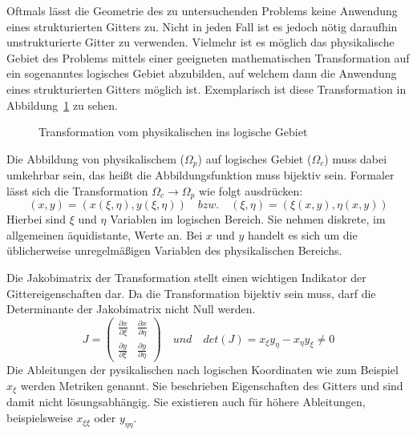 Oftmals lässt die Geometrie des zu untersuchenden Problems keine Anwendung eines
strukturierten Gitters zu. Nicht in jeden Fall ist es jedoch nötig daraufhin unstrukturierte
Gitter zu verwenden. Vielmehr ist es möglich das physikalische Gebiet des Problems
mittels einer geeigneten mathematischen Transformation auf ein sogenanntes
logisches Gebiet abzubilden, auf welchem dann die Anwendung eines strukturierten Gitters
möglich ist. Exemplarisch ist diese Transformation in Abbildung~\ref{fig:transf} zu sehen.
\begin{figure}[ht]

\centering
\caption{Transformation vom physikalischen ins logische Gebiet}
\label{fig:transf}
\end{figure}
Die Abbildung von physikalischem ($\Omega_p$) auf logisches Gebiet ($\Omega_c$) muss dabei umkehrbar sein, das heißt
die Abbildungsfunktion muss bijektiv sein. Formaler lässt sich die Transformation
$\Omega_c \rightarrow \Omega_p$ wie folgt ausdrücken:
\begin{equation}
  (x,y) = (x(\xi, \eta), y(\xi, \eta)) \quad bzw. \quad (\xi,\eta) = (\xi(x, y), \eta(x,y))
\end{equation}
Hierbei sind $\xi$ und $\eta$ Variablen im logischen Bereich. Sie nehmen diskrete, im allgemeinen äquidistante,
Werte an. Bei $x$ und $y$ handelt es sich um die üblicherweise unregelmäßigen Variablen des physikalischen Bereichs.

Die Jakobimatrix der Transformation stellt einen wichtigen Indikator der Gittereigenschaften dar.
Da die Transformation bijektiv sein muss, darf die Determinante der Jakobimatrix nicht Null werden.
\begin{equation}
  J = 
  \begin{pmatrix}
    \frac{\partial x}{\partial \xi} & \frac{\partial x}{\partial \eta} \\
    \frac{\partial y}{\partial \xi} & \frac{\partial y}{\partial \eta}
  \end{pmatrix}
  \quad und \quad
  det (J) = x_{\xi}y_{\eta} - x_{\eta} y_{\xi} \neq 0
\end{equation}
Die Ableitungen der pysikalischen nach logischen Koordinaten wie
zum Beispiel $x_{\xi}$ werden Metriken genannt. Sie beschrieben Eigenschaften
des Gitters und sind damit nicht lösungsabhängig. Sie existieren auch
für höhere Ableitungen, beispielsweise $x_{\xi\xi}$ oder $y_{\eta\eta}$.
